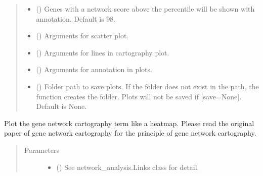 \documentclass[letterpaper,10pt,english]{sphinxmanual}
\begin{document}
\begin{fulllineitems}
\begin{fulllineitems}
\begin{quote}
\begin{description}
\begin{itemize}
\item {} 
 () \textendash{} Genes with a network score above the percentile will be shown with annotation. Default is 98.

\item {} 
 () \textendash{} Arguments for scatter plot.

\item {} 
 () \textendash{} Arguments for lines in cartography plot.

\item {} 
 () \textendash{} Arguments for annotation in plots.

\item {} 
 () \textendash{} Folder path to save plots. If the folder does not exist in the path, the function creates the folder.
Plots will not be saved if {[}save=None{]}. Default is None.

\end{itemize}

\end{description}\end{quote}

\end{fulllineitems}


\begin{fulllineitems}
\label{\detokenize{modules/celloracle:celloracle.Links.plot_cartography_term}}
Plot the gene network cartography term like a heatmap.
Please read the original paper of gene network cartography for the principle of gene network cartography.
\begin{quote}\begin{description}
\item[{Parameters}] \leavevmode\begin{itemize}
\item {} 
 ({\hyperref[\detokenize{modules/celloracle:celloracle.Links}]{}}) \textendash{} See network\_analysis.Links class for detail.


\end{itemize}
\end{description}
\end{quote}
\end{fulllineitems}
\end{fulllineitems}
\end{document}
